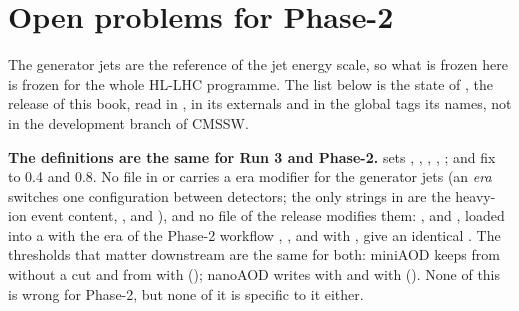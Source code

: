 \FloatBarrier
\section{Open problems for Phase-2}

The generator jets are the reference of the jet energy scale, so what is frozen here is frozen for the whole HL-LHC
programme. The list below is the state of , the release of this book, read in
, in its externals and in the global tags its  names, not in the
development branch of CMSSW.

\textbf{The definitions are the same for Run 3 and Phase-2.}
 sets  , 
,  ,  ,  ;
 and  fix  to 0.4 and 0.8. No file in
 or  carries a  era modifier for
the generator jets (an \emph{era} switches one configuration between detectors; the only  strings in
 are the heavy-ion event content, , and
), and no file of the release modifies them: ,
 and , loaded into a  with the era of the Phase-2
workflow , , and with , give an identical .
The thresholds that matter downstream are the same for both: miniAOD keeps  from
 without a cut and  from  with 
(); nanoAOD writes  with  and  with  (). None of this is
wrong for Phase-2, but none of it is specific to it either.

